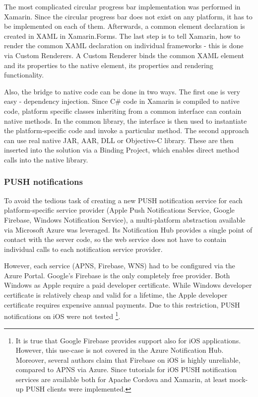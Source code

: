 \documentclass[english,master,public,dept460,male,cpdeclaration,oneside]{diploma}
\begin{document}
The most complicated circular progress bar implementation was performed in Xamarin. Since the circular progress bar does not exist on any platform, it has to be implemented on each of them. Afterwards, a common element declaration is created in XAML in Xamarin.Forms. The last step is to tell Xamarin, how to render the common XAML declaration on individual frameworks - this is done via Custom Renderers. A Custom Renderer binds the common XAML element and its properties to the native element, its properties and rendering functionality.

Also, the bridge to native code can be done in two ways. The first one is very easy - dependency injection. Since C\# code in Xamarin is compiled to native code, platform specific classes inheriting from a common interface can contain native methods. In the common library, the interface is then used to instantiate the platform-specific code and invoke a particular method. The second approach can use real native JAR, AAR, DLL or Objective-C library. These are then inserted into the solution via a Binding Project, which enables direct method calls into the native library.

\subsubsection{PUSH notifications}
To avoid the tedious task of creating a new PUSH notification service for each platform-specific service provider (Apple Push Notifications Service, Google Firebase, Windows Notification Service), a multi-platform abstraction available via Microsoft Azure was leveraged. Its Notification Hub provides a single point of contact with the server code, so the web service does not have to contain individual calls to each notification service provider.

However, each service (APNS, Firebase, WNS) had to be configured via the Azure Portal. Google's Firebase is the only completely free provider. Both Windows as Apple require a paid developer certificate. While Windows developer certificate is relatively cheap and valid for a lifetime, the Apple developer certificate requires expensive annual payments. Due to this restriction, PUSH notifications on iOS were not tested \footnote{It is true that Google Firebase provides support also for iOS applications. However, this use-case is not covered in the Azure Notification Hub. Moreover, several authors claim that Firebase on iOS is highly unreliable, compared to APNS via Azure. Since tutorials for iOS PUSH notification services are available both for Apache Cordova and Xamarin, at least mock-up PUSH clients were implemented.}.
\end{document}
